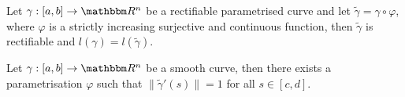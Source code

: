 \documentclass[Analysis-3]{subfiles}
\begin{document}
\begin{Thm}{}{}\label{thm2:22}
    Let $\gamma : [a,b] \to \R^n$ be a rectifiable parametrised curve and let $\tilde{\gamma} = \gamma \circ \varphi$, where $\varphi$ is a strictly increasing surjective and continuous function, then $\tilde{\gamma}$ is rectifiable and $l(\gamma) = l(\tilde{\gamma})$. 
\end{Thm}

\begin{Thm}{}{}\label{thm3:22}
    Let $\gamma : [a,b] \to \R^n$ be a smooth curve, then there exists a parametrisation $\varphi$ such that $\| \tilde{\gamma}'(s) \| = 1$ for all $s \in [c,d]$.
\end{Thm}
\end{document}
